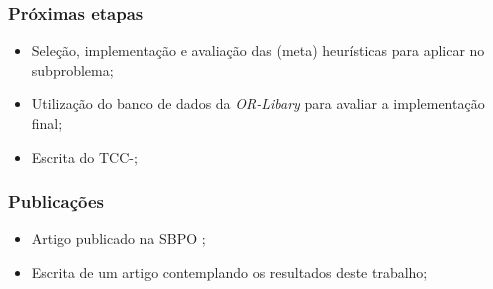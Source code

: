 \documentclass{beamer}
\newcommand{\RNum}[1]{\uppercase\expandafter{\romannumeral #1\relax}}
\begin{document}
\begin{frame}
    \frametitle{Próximas etapas}
    \begin{itemize}
        \item Seleção, implementação e avaliação das (meta) heurísticas para aplicar no subproblema;
        \item Utilização do banco de dados da \textit{OR-Libary} para avaliar a implementação final;
        \item Escrita do TCC-\RNum{2};
    \end{itemize}
\end{frame}

\begin{frame}
    \frametitle{Publicações}
    \begin{itemize}
        \item Artigo publicado na SBPO \RNum{48};
        \item Escrita de um artigo contemplando os resultados deste trabalho;
    \end{itemize}
\end{frame}
\end{document}
